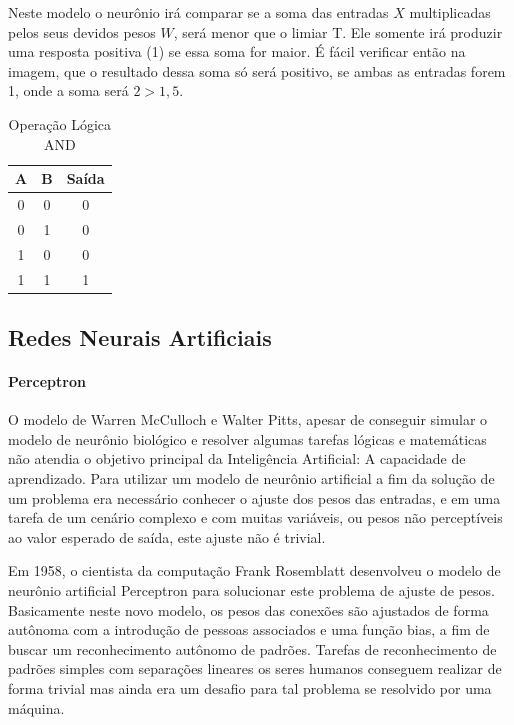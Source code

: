 \documentclass[	12pt, Times, openright, twoside, a4paper, english, brazil]{abntex2}
\begin{document}
            Neste modelo o neurônio irá comparar se a soma das entradas $X$ multiplicadas pelos seus devidos pesos $W$, será menor que o limiar T. Ele somente irá produzir uma resposta positiva (1) se essa soma for maior. É fácil verificar então na imagem, que o resultado dessa soma só será positivo, se ambas as entradas forem 1, onde a soma será $2>1,5$.

            \begin{table}[!ht]
            \centering
            \caption{Operação Lógica AND} \label{tab:and}
              \begin{tabular}{|c|c|c|}
                  \hline  \textbf{A} & \textbf{B} &  \textbf{Saída}\\
                  \hline 0 & 0 & 0\\
                  \hline 0 & 1 & 0\\
                  \hline 1 & 0 & 0\\
                  \hline 1 & 1 & 1\\
                  \hline 
              \end{tabular}
            \end{table}

        \subsection{Redes Neurais Artificiais}
          \paragraph*{Perceptron}
            O modelo de Warren McCulloch e Walter Pitts, apesar de conseguir simular o modelo de neurônio biológico e resolver algumas tarefas lógicas e matemáticas não atendia o objetivo principal da Inteligência Artificial: A capacidade de aprendizado.
            Para utilizar um modelo de neurônio artificial a fim da solução de um problema era necessário conhecer o ajuste dos pesos das entradas, e em uma tarefa de um cenário complexo e com muitas variáveis, ou pesos não perceptíveis ao valor esperado de saída, este ajuste não é trivial.
            
            Em 1958, o cientista da computação Frank Rosemblatt desenvolveu o modelo de neurônio artificial Perceptron para solucionar este problema de ajuste de pesos.
            Basicamente neste novo modelo, os pesos das conexões são ajustados de forma autônoma com a introdução de pessoas associados e uma função bias, a fim de buscar um reconhecimento autônomo de padrões. Tarefas de reconhecimento de padrões simples com separações lineares os seres humanos conseguem realizar de forma trivial mas ainda era um desafio para tal problema se resolvido por uma máquina.
\end{document}
